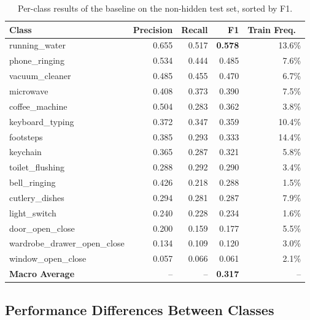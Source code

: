 \documentclass{article}
\begin{document}
\begin{table}[H]
  \caption{Per-class results of the baseline on the non-hidden test set, sorted by F1.}
  \label{tab:baseline-perclass}
  \centering
  \small
  \begin{tabular}{lrrrr}
    \toprule
    Class & Precision & Recall & F1 & Train Freq.\ \\
    \midrule
    running\_water              & 0.655 & 0.517 & \textbf{0.578} & 13.6\% \\
    phone\_ringing              & 0.534 & 0.444 & 0.485 & 7.6\% \\
    vacuum\_cleaner             & 0.485 & 0.455 & 0.470 & 6.7\% \\
    microwave                   & 0.408 & 0.373 & 0.390 & 7.5\% \\
    coffee\_machine             & 0.504 & 0.283 & 0.362 & 3.8\% \\
    keyboard\_typing            & 0.372 & 0.347 & 0.359 & 10.4\% \\
    footsteps                   & 0.385 & 0.293 & 0.333 & 14.4\% \\
    keychain                    & 0.365 & 0.287 & 0.321 & 5.8\% \\
    toilet\_flushing            & 0.288 & 0.292 & 0.290 & 3.4\% \\
    bell\_ringing               & 0.426 & 0.218 & 0.288 & 1.5\% \\
    cutlery\_dishes             & 0.294 & 0.281 & 0.287 & 7.9\% \\
    light\_switch               & 0.240 & 0.228 & 0.234 & 1.6\% \\
    door\_open\_close           & 0.200 & 0.159 & 0.177 & 5.5\% \\
    wardrobe\_drawer\_open\_close & 0.134 & 0.109 & 0.120 & 3.0\% \\
    window\_open\_close         & 0.057 & 0.066 & 0.061 & 2.1\% \\
    \midrule
    \textbf{Macro Average}      & --    & --    & \textbf{0.317} & -- \\
    \bottomrule
  \end{tabular}
\end{table}

\subsection{Performance Differences Between Classes}
\end{document}
